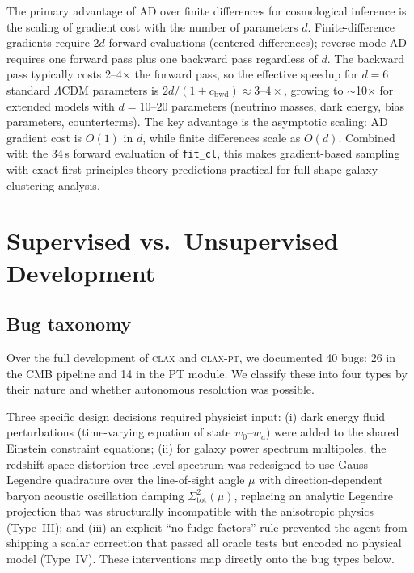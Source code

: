\documentclass{article}
\newcommand{\clax}{\textsc{clax}\xspace}
\newcommand{\claxpt}{\textsc{clax-pt}\xspace}
\begin{document}
The primary advantage of AD over finite differences for cosmological inference is the scaling of gradient cost with the number of parameters $d$.
Finite-difference gradients require $2d$ forward evaluations (centered differences); reverse-mode AD requires one forward pass plus one backward pass regardless of $d$.
The backward pass typically costs 2--4$\times$ the forward pass, so the effective speedup for $d = 6$ standard $\Lambda$CDM parameters is $2d / (1 + c_\mathrm{bwd}) \approx 3$--$4\times$, growing to $\sim$10$\times$ for extended models with $d = 10$--$20$ parameters (neutrino masses, dark energy, bias parameters, counterterms).
The key advantage is the asymptotic scaling: AD gradient cost is $O(1)$ in $d$, while finite differences scale as $O(d)$.
Combined with the 34\,s forward evaluation of \texttt{fit\_cl}, this makes gradient-based sampling with exact first-principles theory predictions practical for full-shape galaxy clustering analysis.

\section{Supervised vs.\ Unsupervised Development}
\label{sec:supervised}

\subsection{Bug taxonomy}

Over the full development of \clax and \claxpt, we documented 40 bugs: 26 in the CMB pipeline and 14 in the PT module.
We classify these into four types by their nature and whether autonomous resolution was possible.

Three specific design decisions required physicist input: (i) dark energy fluid perturbations (time-varying equation of state $w_0$--$w_a$) were added to the shared Einstein constraint equations; (ii) for galaxy power spectrum multipoles, the redshift-space distortion tree-level spectrum was redesigned to use Gauss--Legendre quadrature over the line-of-sight angle $\mu$ with direction-dependent baryon acoustic oscillation damping $\Sigma^2_\mathrm{tot}(\mu)$, replacing an analytic Legendre projection that was structurally incompatible with the anisotropic physics (Type~III); and (iii) an explicit ``no fudge factors'' rule prevented the agent from shipping a scalar correction that passed all oracle tests but encoded no physical model (Type~IV). These interventions map directly onto the bug types below.
\end{document}
